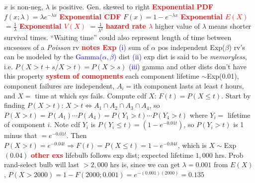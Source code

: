 \documentclass[9pt]{extarticle}
\newcommand{\re}[1]{\textcolor{red}{\textbf{#1}}}
\newcommand{\bt}[1]{\textcolor{blue}{#1}}
\begin{document}
	$x$ is non-neg, $\lambda$ is positive. Gen. skewed to right
	\re{Exponential PDF} $f(x;\lambda) = \lambda e^{-\lambda x}$
	\re{Exponential CDF} $F(x) = 1-e^{-\lambda x}$
	\re{Exponential $E(X)$} $= \frac{1}{\lambda}$
	\re{Exponential $V(X)$} $= \frac{1}{\lambda^{2}}$
	\re{hazard rate $\lambda$} higher value of $\lambda$ means shorter survival times.
	``Waiting time'' could also represent length of time between sucsesses of a
	\emph{Poisson} rv
	\re{notes Exp}
	\bt{(i)} sum of $\alpha$ pos independent Exp($\beta$) rv's can be modeled by
	the \bt{Gamma($\alpha, \beta$)} dist
	\bt{(ii)} exp dist is said to be \emph{memoryless}, i.e. $P(X>t+s/X>t)=P(X>s)$
	\bt{(iii)} gamma and other dists don't have this property
	\re{system of comopnents} each component lifetime $\mathtt{\sim}$Exp(0.01),
	component failures are independent, $A_{i}=$ith component lasts at least $t$ hours,
	and $X=$ time at which sys fails. Compute cdf $X$: $F(t) = P(X\leq t)$.
	Start by finding $P(X>t)$: $X>t \Leftrightarrow A_{1}\cap A_{2} \cap A_{3} \cap
	A_{4}$, so $P(X>t)=P(A_{1})\cdots P(A_{4}) = P(Y_{1}>t)\cdots P(Y_{4}>t)$ where
	$Y_{i}=$ lifetime of component $i$. Note cdf $Y_{i}$ is $P(Y_{i}\leq t)
	= (1 - e^{-0.01t})$, so $P(Y_{i} > t)$ is 1 minus that  $=e^{-0.01t}$. Then 
	$P(X>t) = e^{-0.04t} \Rightarrow F(t) = P(X\leq t) = 1 - e^{-0.04t}$, which is
	$X\mathtt{\sim}$Exp$(0.04)$
	\re{other exs} lifebulb follows exp dist; expected lifetime $1,000$ hrs.
	Prob rand-select bulb will last $>2,000$ hrs is, since we can get $\lambda=0.001$
	from $E(X)$, $P(X>2000) = 1 - F(2000;0.001) = e^{-(0.001)(2000)} = 0.135$ \\
	
\end{document}
